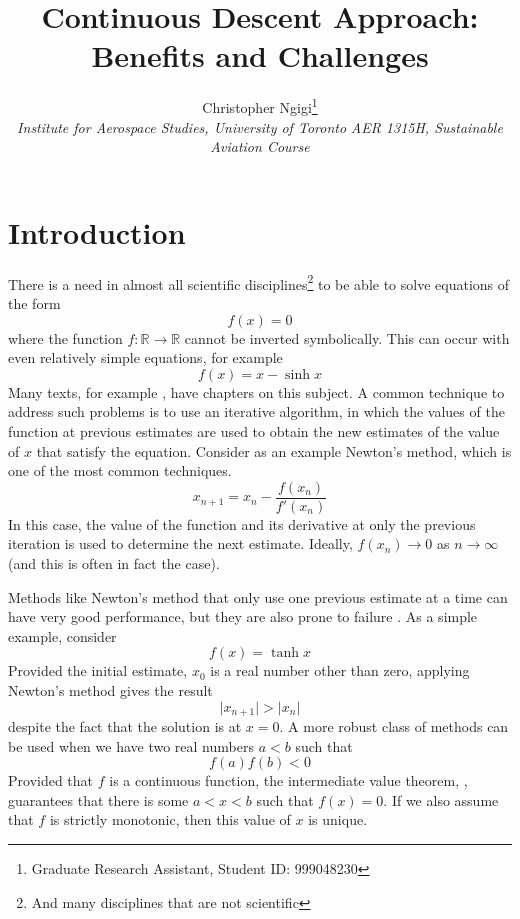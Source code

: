 \documentclass{aiaa-pretty}
\author[]{ %
Christopher Ngigi\thanks{Graduate Research Assistant, Student ID: 999048230}\\
\textit{Institute for Aerospace Studies, University of Toronto}
\textit{AER 1315H, Sustainable Aviation Course}}
\title{Continuous Descent Approach: Benefits and Challenges}
\begin{document}
\maketitle

\section{Introduction}
There is a need in almost all scientific disciplines\footnote{And many disciplines that are not scientific} to be able to solve equations of the form
\begin{equation}
f(x)=0
\end{equation}
where the function $f:\mathbb{R}\to\mathbb{R}$ cannot be inverted symbolically.  This can occur with even relatively simple equations, for example
\begin{equation}
f(x)=x - \sinh x
\end{equation}
Many texts, for example \cite{chapra:2002:numerics}, have chapters on this subject.  A common technique to address such problems is to use an iterative algorithm, in which the values of the function at previous estimates are used to obtain the new estimates of the value of $x$ that satisfy the equation.  Consider as an example Newton's method, which is one of the most common techniques.
\begin{equation}
x_{n+1} = x_n - \frac{f(x_n)}{f'(x_n)}
\end{equation}
In this case, the value of the function and its derivative at only the previous iteration is used to determine the next estimate.  Ideally, $f(x_n)\to 0$ as $n\to\infty$ (and this is often in fact the case).

Methods like Newton's method that only use one previous estimate at a time can have very good performance, but they are also prone to failure \cite{ypma:1995:newton-raphson}.  As a simple example, consider
\begin{equation}
f(x) = \tanh x
\end{equation}
Provided the initial estimate, $x_0$ is a real number other than zero, applying Newton's method gives the result
\begin{equation}
\lvert x_{n+1} \rvert > \lvert x_n \rvert
\end{equation}
despite the fact that the solution is at $x=0$.  A more robust class of methods can be used when we have two real numbers $a<b$ such that
\begin{equation}
f(a)f(b) < 0
\end{equation}
Provided that $f$ is a continuous function, the intermediate value theorem, \cite{rudin:1976:analysis}, guarantees that there is some $a < x < b$ such that $f(x)=0$.  If we also assume that $f$ is strictly monotonic, then this value of $x$ is unique.
\end{document}
